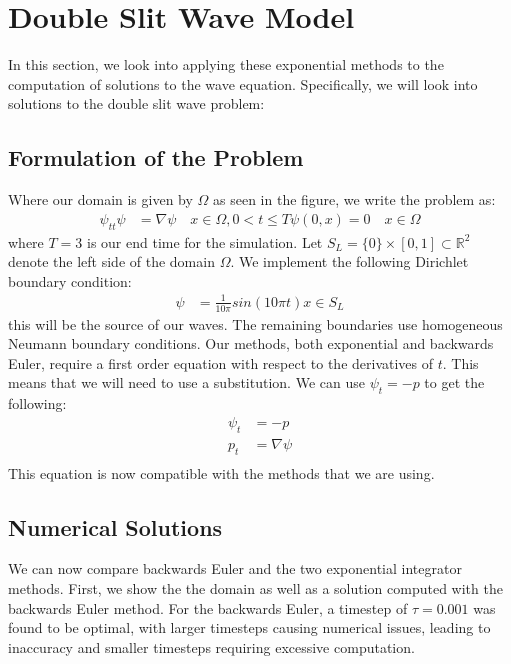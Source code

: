 \section{Double Slit Wave Model}

In this section, we look into applying these exponential methods to the computation of solutions to the wave equation.
Specifically, we will look into solutions to the double slit wave problem:

\subsection{Formulation of the Problem}
Where our domain is given by $\Omega$ as seen in the figure, we write the problem as:
\begin{align*}
    \psi_{tt}\psi &= \nabla \psi \quad x \in \Omega, 0<t\leq T
    \psi(0,x) = 0 \quad x \in \Omega
\end{align*}
where $T=3$ is our end time for the simulation.
Let $S_L = \{0\} \times [0,1] \subset \mathbb{R}^2$ denote the left side of the domain $\Omega$.
We implement the following Dirichlet boundary condition:
\begin{align*}
    \psi &= \frac{1}{10\pi} sin(10\pi t) x \in S_L
\end{align*}
this will be the source of our waves.
The remaining boundaries use homogeneous Neumann boundary conditions.
Our methods, both exponential and backwards Euler, require a first order equation with respect to the derivatives of $t$.
This means that we will need to use a substitution.
We can use $\psi_t = -p$ to get the following:
\begin{align*}
    \psi_t &= -p\\
    p_t &= \nabla \psi\\
\end{align*}
This equation is now compatible with the methods that we are using.

\subsection{Numerical Solutions}
We can now compare backwards Euler and the two exponential integrator methods.
First, we show the the domain as well as a solution computed with the backwards Euler method.
For the backwards Euler, a timestep of $\tau = 0.001$ was found to be optimal, with larger timesteps causing numerical issues, leading to inaccuracy and smaller timesteps requiring excessive computation.

